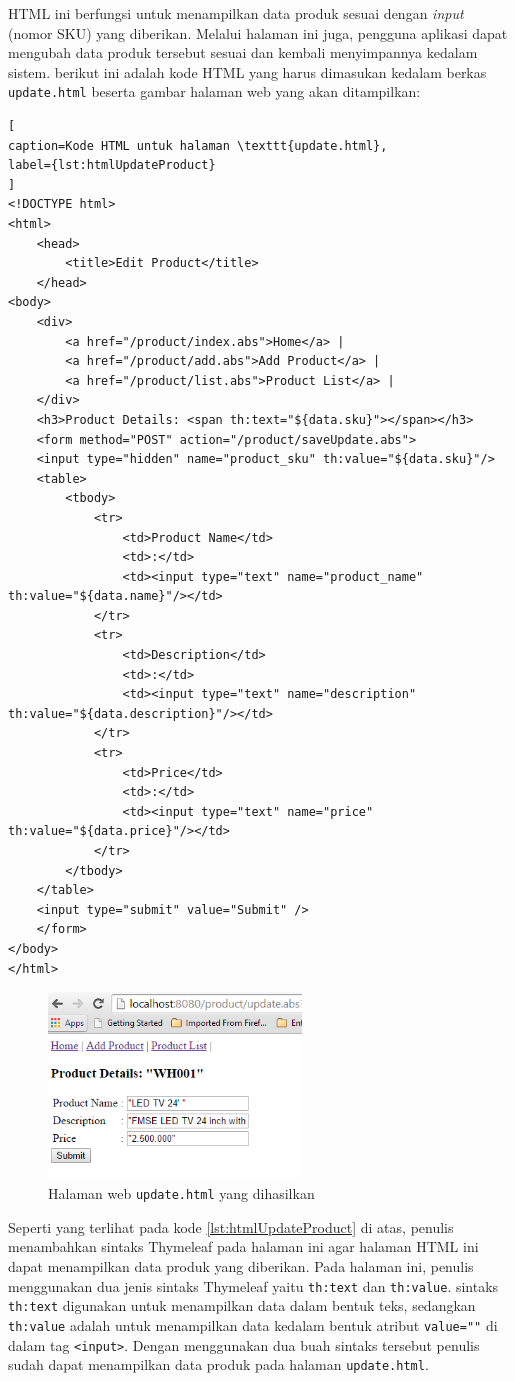 HTML ini berfungsi untuk menampilkan data produk sesuai dengan \textit{input} (nomor SKU) yang diberikan. Melalui halaman ini juga, pengguna aplikasi dapat mengubah data produk tersebut sesuai dan kembali menyimpannya kedalam sistem. berikut ini adalah kode HTML yang harus dimasukan kedalam berkas \texttt{update.html} beserta gambar halaman web yang akan ditampilkan:

\begin{lstlisting}[
caption=Kode HTML untuk halaman \texttt{update.html},
label={lst:htmlUpdateProduct}
]
<!DOCTYPE html>
<html>
	<head>
		<title>Edit Product</title>
	</head>
<body>
	<div>
		<a href="/product/index.abs">Home</a> |
		<a href="/product/add.abs">Add Product</a> |
		<a href="/product/list.abs">Product List</a> |
	</div>
	<h3>Product Details: <span th:text="${data.sku}"></span></h3>
	<form method="POST" action="/product/saveUpdate.abs">
	<input type="hidden" name="product_sku" th:value="${data.sku}"/>
	<table>
		<tbody>
			<tr>
				<td>Product Name</td>
				<td>:</td>
				<td><input type="text" name="product_name" th:value="${data.name}"/></td>
			</tr>
			<tr>
				<td>Description</td>
				<td>:</td>
				<td><input type="text" name="description" th:value="${data.description}"/></td>
			</tr>
			<tr>
				<td>Price</td>
				<td>:</td>
				<td><input type="text" name="price" th:value="${data.price}"/></td>
			</tr>
		</tbody>
	</table>
	<input type="submit" value="Submit" />
	</form>
</body>
</html>
\end{lstlisting}

\begin{figure}
    \centering
    \includegraphics[width=0.6\textwidth]{img/hasil-update.png}
    \caption{Halaman web \texttt{update.html} yang dihasilkan}
    \label{fig:htmlUpdate}
\end{figure}

Seperti yang terlihat pada kode \ref{lst:htmlUpdateProduct} di atas, penulis menambahkan sintaks Thymeleaf pada halaman ini agar halaman HTML ini dapat menampilkan data produk yang diberikan. Pada halaman ini, penulis menggunakan dua jenis sintaks Thymeleaf yaitu \texttt{th:text} dan \texttt{th:value}. sintaks \texttt{th:text} digunakan untuk menampilkan data dalam bentuk teks, sedangkan \texttt{th:value} adalah untuk menampilkan data kedalam bentuk atribut \texttt{value=""} di dalam tag \texttt{<input>}. Dengan menggunakan dua buah sintaks tersebut penulis sudah dapat menampilkan data produk pada halaman \texttt{update.html}.

